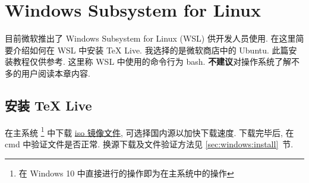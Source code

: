 
\chapter{Windows Subsystem for Linux}

目前微软推出了 Windows Subsystem for Linux (WSL) 供开发人员使用.
在这里简要介绍如何在 WSL 中安装 \TeX{} Live.
我选择的是微软商店中的 Ubuntu.
此篇安装教程仅供参考.
这里称 WSL 中使用的命令行为 \textsf{bash}.
\textbf{不建议}对操作系统了解不多的用户阅读本章内容.

\section{安装 \TeX{} Live}

在主系统%
\footnote{在 Windows 10 中直接进行的操作即为在主系统中的操作}%
中下载
\href{http://mirrors.ctan.org/systems/texlive/Images/texlive2019.iso}{iso 镜像文件},
可选择国内源以加快下载速度.
下载完毕后, 在 \textsf{cmd} 中验证文件是否正常.
换源下载及文件验证方法见 \ref{sec:windows:install}~节.

